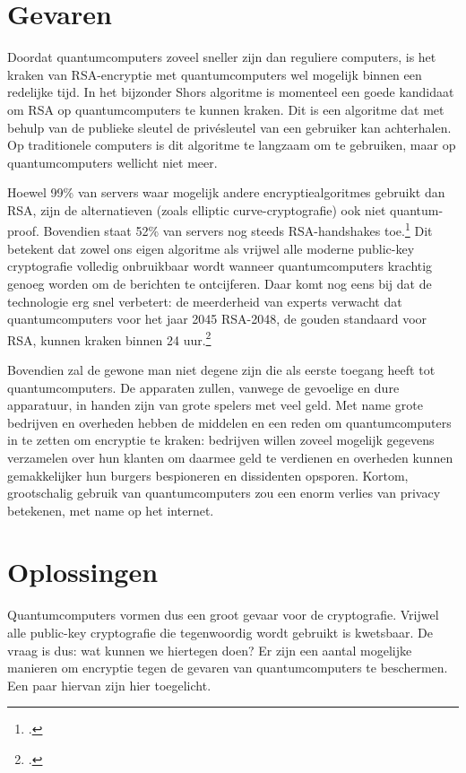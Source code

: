 \documentclass{report} %
\begin{document}
\section{Gevaren}
Doordat quantumcomputers zoveel sneller zijn dan reguliere computers, is het kraken van RSA-encryptie met quantumcomputers wel mogelijk binnen een redelijke tijd. In het bijzonder Shors algoritme is momenteel een goede kandidaat om RSA op quantumcomputers te kunnen kraken. Dit is een algoritme dat met behulp van de publieke sleutel de privésleutel van een gebruiker kan achterhalen. Op traditionele computers is dit algoritme te langzaam om te gebruiken, maar op quantumcomputers wellicht niet meer.
\par Hoewel 99\% van servers waar mogelijk andere encryptiealgoritmes gebruikt dan RSA, zijn de alternatieven (zoals elliptic curve-cryptografie) ook niet quantum-proof. Bovendien staat 52\% van servers nog steeds RSA-handshakes toe.\footnote{\cite{f5telemetry}.} Dit betekent dat zowel ons eigen algoritme als vrijwel alle moderne public-key cryptografie volledig onbruikbaar wordt wanneer quantumcomputers krachtig genoeg worden om de berichten te ontcijferen. Daar komt nog eens bij dat de technologie erg snel verbetert: de meerderheid van experts verwacht dat quantumcomputers voor het jaar 2045 RSA-2048, de gouden standaard voor RSA, kunnen kraken binnen 24 uur.\footnote{\cite{econ_quantum}.} 
\par Bovendien zal de gewone man niet degene zijn die als eerste toegang heeft tot quantumcomputers. De apparaten zullen, vanwege de gevoelige en dure apparatuur, in handen zijn van grote spelers met veel geld. Met name grote bedrijven en overheden hebben de middelen en een reden om quantumcomputers in te zetten om encryptie te kraken: bedrijven willen zoveel mogelijk gegevens verzamelen over hun klanten om daarmee geld te verdienen en overheden kunnen gemakkelijker hun burgers bespioneren en dissidenten opsporen. Kortom, grootschalig gebruik van quantumcomputers zou een enorm verlies van privacy betekenen, met name op het internet. %

\section{Oplossingen}
Quantumcomputers vormen dus een groot gevaar voor de cryptografie. Vrijwel alle public-key cryptografie die tegenwoordig wordt gebruikt is kwetsbaar. De vraag is dus: wat kunnen we hiertegen doen? Er zijn een aantal mogelijke manieren om encryptie tegen de gevaren van quantumcomputers te beschermen. Een paar hiervan zijn hier toegelicht.
\end{document}

